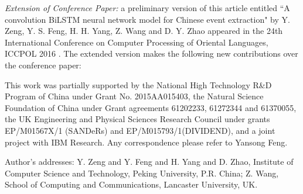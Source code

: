 
\begin{bottomstuff}
\emph{Extension of Conference Paper:} a preliminary version of this article entitled ``A convolution BiLSTM neural
network model for Chinese event extraction" by Y. Zeng, Y. S. Feng, H. H. Yang, Z. Wang and D. Y. Zhao appeared in the 24th
International Conference on Computer Processing of Oriental Languages, ICCPOL 2016 \FIXME{\cite{}}. The extended
version makes the following new contributions over the conference paper: 


This work was partially supported by the National High Technology R\&D Program of China under Grant No. 2015AA015403,
  the Natural Science Foundation of China under Grant agreements 61202233, 61272344 and 61370055, the UK Engineering
  and Physical Sciences Research Council under grants EP/M01567X/1 (SANDeRs) and EP/M015793/1(DIVIDEND), and a joint
  project with IBM Research. Any correspondence please refer to Yansong Feng.

Author's addresses: Y. Zeng {and} Y. Feng {and} H. Yang {and} D. Zhao, Institute of Computer Science and Technology,
    Peking University, P.R. China; Z. Wang, School of Computing and Communications, Lancaster University, UK.
\end{bottomstuff}
